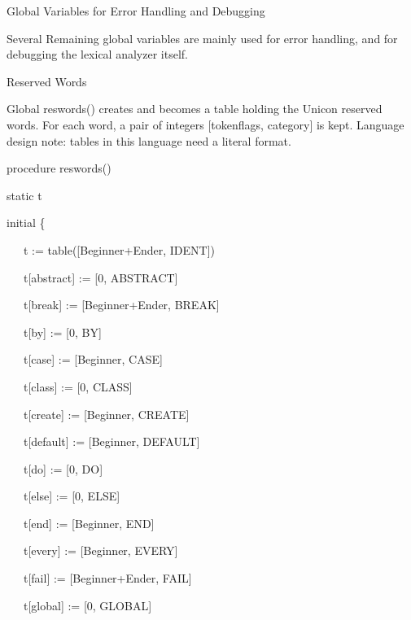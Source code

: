 {\sffamily
Global Variables for Error Handling and Debugging }


Several Remaining global variables are mainly used for error handling,
and for debugging the lexical analyzer itself.

{\sffamily
Reserved Words }


Global reswords() creates and becomes a table holding the Unicon
reserved words. For each word, a pair of integers [tokenflags,
category] is kept. Language design note: tables in this language need
a {\textquotedbl}literal{\textquotedbl} format.

{\ttfamily\mdseries
procedure reswords()}

{\ttfamily\mdseries
static t}

{\ttfamily\mdseries
initial \{}

{\ttfamily\mdseries
\ \ \ t := table([Beginner+Ender, IDENT])}


\bigskip

{\ttfamily\mdseries
\ \ \ t[{\textquotedbl}abstract{\textquotedbl}] := [0, ABSTRACT]}

{\ttfamily\mdseries
\ \ \ t[{\textquotedbl}break{\textquotedbl}] := [Beginner+Ender, BREAK]}

{\ttfamily\mdseries
\ \ \ t[{\textquotedbl}by{\textquotedbl}] := [0, BY]}

{\ttfamily\mdseries
\ \ \ t[{\textquotedbl}case{\textquotedbl}] := [Beginner, CASE]}

{\ttfamily\mdseries
\ \ \ t[{\textquotedbl}class{\textquotedbl}] := [0, CLASS]}

{\ttfamily\mdseries
\ \ \ t[{\textquotedbl}create{\textquotedbl}] := [Beginner, CREATE]}

{\ttfamily\mdseries
\ \ \ t[{\textquotedbl}default{\textquotedbl}] := [Beginner, DEFAULT]}

{\ttfamily\mdseries
\ \ \ t[{\textquotedbl}do{\textquotedbl}] := [0, DO]}

{\ttfamily\mdseries
\ \ \ t[{\textquotedbl}else{\textquotedbl}] := [0, ELSE]}

{\ttfamily\mdseries
\ \ \ t[{\textquotedbl}end{\textquotedbl}] := [Beginner, END]}

{\ttfamily\mdseries
\ \ \ t[{\textquotedbl}every{\textquotedbl}] := [Beginner, EVERY]}

{\ttfamily\mdseries
\ \ \ t[{\textquotedbl}fail{\textquotedbl}] := [Beginner+Ender, FAIL]}

{\ttfamily\mdseries
\ \ \ t[{\textquotedbl}global{\textquotedbl}] := [0, GLOBAL]}

